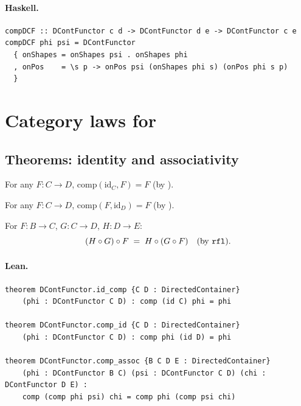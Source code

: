 \documentclass[11pt,a4paper]{article}
\begin{document}
\paragraph{Haskell.}
\begin{lstlisting}[style=haskell]
compDCF :: DContFunctor c d -> DContFunctor d e -> DContFunctor c e
compDCF phi psi = DContFunctor
  { onShapes = onShapes psi . onShapes phi
  , onPos    = \s p -> onPos psi (onShapes phi s) (onPos phi s p)
  }
\end{lstlisting}


\section{Category laws for }

\subsection{Theorems: identity and associativity}

\begin{thm}
For any $F : C \to D$, $\mathrm{comp}(\mathrm{id}_C, F) = F$ (by ).
\end{thm}

\begin{thm}
For any $F : C \to D$, $\mathrm{comp}(F, \mathrm{id}_D) = F$ (by ).
\end{thm}

\begin{thm}[Associativity]
For $F : B \to C$, $G : C \to D$, $H : D \to E$:
\[
  (H \circ G) \circ F \;=\; H \circ (G \circ F) \quad\text{(by \texttt{rfl})}.
\]
\end{thm}

\paragraph{Lean.}
\begin{lstlisting}[style=lean]
theorem DContFunctor.id_comp {C D : DirectedContainer}
    (phi : DContFunctor C D) : comp (id C) phi = phi

theorem DContFunctor.comp_id {C D : DirectedContainer}
    (phi : DContFunctor C D) : comp phi (id D) = phi

theorem DContFunctor.comp_assoc {B C D E : DirectedContainer}
    (phi : DContFunctor B C) (psi : DContFunctor C D) (chi : DContFunctor D E) :
    comp (comp phi psi) chi = comp phi (comp psi chi)
\end{lstlisting}
\end{document}
